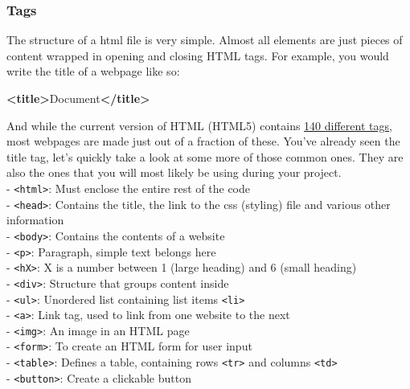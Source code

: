 \documentclass[
]{article}
\newenvironment{Shaded}{\begin{snugshade}}{\end{snugshade}}
\newcommand{\KeywordTok}[1]{\textcolor[rgb]{0.13,0.29,0.53}{\textbf{#1}}}
\newcommand{\NormalTok}[1]{#1}
\begin{document}
\hypertarget{tags}{%
\subsubsection*{Tags}\label{tags}}

The structure of a html file is very simple. Almost all elements are just pieces of content wrapped in opening and closing HTML tags. For example, you would write the title of a webpage like so:

\begin{Shaded}
\begin{Highlighting}[]
\KeywordTok{<title>}\NormalTok{Document}\KeywordTok{</title>}  
\end{Highlighting}
\end{Shaded}

And while the current version of HTML (HTML5) contains \href{https://www.w3schools.com/TAGS/default.ASP}{140 different tags}, most webpages are made just out of a fraction of these. You've already seen the title tag, let's quickly take a look at some more of those common ones. They are also the ones that you will most likely be using during your project.\\
- \texttt{\textless{}html\textgreater{}}: Must enclose the entire rest of the code\\
- \texttt{\textless{}head\textgreater{}}: Contains the title, the link to the css (styling) file and various other information\\
- \texttt{\textless{}body\textgreater{}}: Contains the contents of a website\\
- \texttt{\textless{}p\textgreater{}}: Paragraph, simple text belongs here\\
- \texttt{\textless{}hX\textgreater{}}: X is a number between 1 (large heading) and 6 (small heading)\\
- \texttt{\textless{}div\textgreater{}}: Structure that groups content inside\\
- \texttt{\textless{}ul\textgreater{}}: Unordered list containing list items \texttt{\textless{}li\textgreater{}}\\
- \texttt{\textless{}a\textgreater{}}: Link tag, used to link from one website to the next\\
- \texttt{\textless{}img\textgreater{}}: An image in an HTML page\\
- \texttt{\textless{}form\textgreater{}}: To create an HTML form for user input\\
- \texttt{\textless{}table\textgreater{}}: Defines a table, containing rows \texttt{\textless{}tr\textgreater{}} and columns \texttt{\textless{}td\textgreater{}}\\
- \texttt{\textless{}button\textgreater{}}: Create a clickable button
\end{document}
